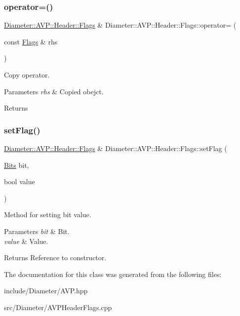 \subsubsection{\texorpdfstring{operator=()}{operator=()}\hspace{0.1cm}{\footnotesize\ttfamily [2/2]}}
{\footnotesize\ttfamily \hyperlink{classDiameter_1_1AVP_1_1Header_1_1Flags}{Diameter\+::\+A\+V\+P\+::\+Header\+::\+Flags} \& Diameter\+::\+A\+V\+P\+::\+Header\+::\+Flags\+::operator= (\begin{DoxyParamCaption}\item[{const \hyperlink{classDiameter_1_1AVP_1_1Header_1_1Flags}{Flags} \&}]{rhs }\end{DoxyParamCaption})}



Copy operator. 


\begin{DoxyParams}{Parameters}
{\em rhs} & Copied obejct. \\
\hline
\end{DoxyParams}
\begin{DoxyReturn}{Returns}

\end{DoxyReturn}
\mbox{\label{classDiameter_1_1AVP_1_1Header_1_1Flags_a4ba216d20eac1f0cab1573b6b354d33c}} 
\subsubsection{\texorpdfstring{set\+Flag()}{setFlag()}}
{\footnotesize\ttfamily \hyperlink{classDiameter_1_1AVP_1_1Header_1_1Flags}{Diameter\+::\+A\+V\+P\+::\+Header\+::\+Flags} \& Diameter\+::\+A\+V\+P\+::\+Header\+::\+Flags\+::set\+Flag (\begin{DoxyParamCaption}\item[{\hyperlink{classDiameter_1_1AVP_1_1Header_1_1Flags_af24fa00d6135e01a5b58c9ae84245262}{Bits}}]{bit,  }\item[{bool}]{value }\end{DoxyParamCaption})}



Method for setting bit value. 


\begin{DoxyParams}{Parameters}
{\em bit} & Bit. \\
\hline
{\em value} & Value. \\
\hline
\end{DoxyParams}
\begin{DoxyReturn}{Returns}
Reference to constructor. 
\end{DoxyReturn}


The documentation for this class was generated from the following files\+:\begin{DoxyCompactItemize}
\item 
include/\+Diameter/A\+V\+P.\+hpp\item 
src/\+Diameter/A\+V\+P\+Header\+Flags.\+cpp\end{DoxyCompactItemize}
